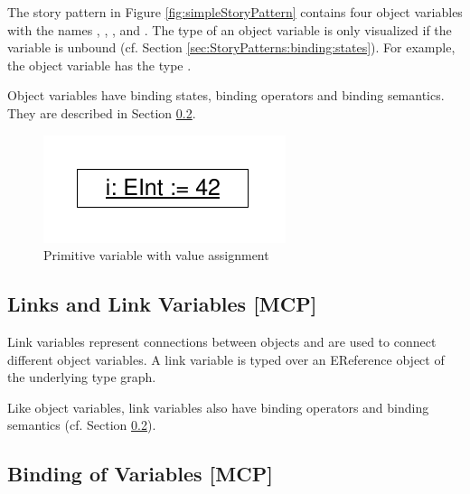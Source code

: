 The story pattern in Figure \ref{fig:simpleStoryPattern} contains four
object variables with the names , , , and
. 
The type of an object variable is only visualized if the
variable is unbound (cf. Section \ref{sec:StoryPatterns:binding:states}). 
For example, the object variable  has the type .

Object variables have binding states, binding operators and binding semantics.
They are described in Section  \ref{sec:StoryPatterns:binding}.

\ext %
{

\begin{figure}[htbp]
  \centering
  \includegraphics[scale=0.6]{figures/PrimitiveVariable}
  \caption{Primitive variable with value assignment}
  \label{fig:primitiveVariable}
\end{figure}

}

\subsection{Links and Link Variables [MCP]}
\label{sec:StoryPatterns:links}

Link variables represent connections between objects and are used to connect
different object variables. A link variable is typed over an EReference object of the underlying
type graph.

Like object variables, link variables also have binding
operators and binding semantics (cf. Section \ref{sec:StoryPatterns:binding}).




\subsection{Binding of Variables [MCP]}
\label{sec:StoryPatterns:binding}

